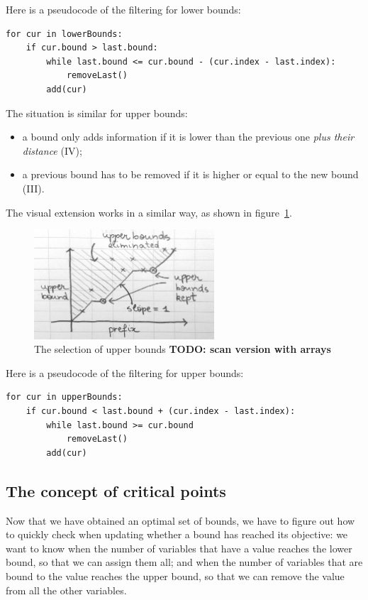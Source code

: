 \documentclass[a4paper,10pt]{article}
\begin{document}
Here is a pseudocode of the filtering for lower bounds:
\begin{lstlisting}
for cur in lowerBounds:
    if cur.bound > last.bound:
        while last.bound <= cur.bound - (cur.index - last.index):
            removeLast()
        add(cur)
\end{lstlisting}

The situation is similar for upper bounds:
\begin{itemize}
    \item a bound only adds information if it is lower than the previous one \emph{plus their distance} (IV);
    \item a previous bound has to be removed if it is higher or equal to the new bound (III).
\end{itemize}

The visual extension works in a similar way, as shown in figure~\ref{fig:upper-bounds}.

\begin{figure}[h!]
    \centering
    \includegraphics[width=0.6\textwidth]{upper-bounds}
    \caption{The selection of upper bounds \textbf{TODO: scan version with arrays}}
    \label{fig:upper-bounds}
\end{figure}

Here is a pseudocode of the filtering for upper bounds:
\begin{lstlisting}
for cur in upperBounds:
    if cur.bound < last.bound + (cur.index - last.index):
        while last.bound >= cur.bound
            removeLast()
        add(cur)
\end{lstlisting}

\subsection{The concept of critical points}
\label{subsec:critical}

Now that we have obtained an optimal set of bounds, we have to figure out how to quickly check when updating whether a bound has reached its objective: we want to know when the number of variables that have a value reaches the lower bound, so that we can assign them all; and when the number of variables that are bound to the value reaches the upper bound, so that we can remove the value from all the other variables.
\end{document}
